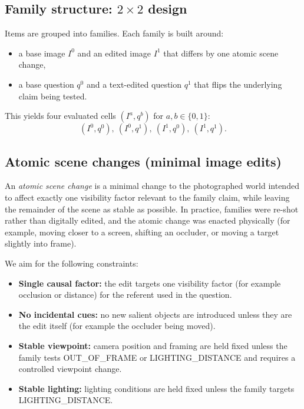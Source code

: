 \documentclass[11pt]{article}
\begin{document}
\subsection{Family structure: \(2 \times 2\) design}

Items are grouped into families. Each family is built around:
\begin{itemize}[noitemsep, topsep=3pt]
  \item a base image \(I^0\) and an edited image \(I^1\) that differs by one atomic scene change,
  \item a base question \(q^0\) and a text-edited question \(q^1\) that flips the underlying claim being tested.
\end{itemize}

This yields four evaluated cells \((I^a, q^b)\) for \(a,b \in \{0,1\}\):
\[
(I^0,q^0),\ (I^0,q^1),\ (I^1,q^0),\ (I^1,q^1).
\]

\subsection{Atomic scene changes (minimal image edits)}
\label{subsec:atomic}

An \emph{atomic scene change} is a minimal change to the photographed world intended to affect exactly one visibility factor relevant to the family claim, while leaving the remainder of the scene as stable as possible. In practice, families were re-shot rather than digitally edited, and the atomic change was enacted physically (for example, moving closer to a screen, shifting an occluder, or moving a target slightly into frame).

We aim for the following constraints:
\begin{itemize}[noitemsep, topsep=3pt]
  \item \textbf{Single causal factor:} the edit targets one visibility factor (for example occlusion or distance) for the referent used in the question.
  \item \textbf{No incidental cues:} no new salient objects are introduced unless they are the edit itself (for example the occluder being moved).
  \item \textbf{Stable viewpoint:} camera position and framing are held fixed unless the family tests OUT\_OF\_FRAME or LIGHTING\_DISTANCE and requires a controlled viewpoint change.
  \item \textbf{Stable lighting:} lighting conditions are held fixed unless the family targets LIGHTING\_DISTANCE.
\end{itemize}
\end{document}
